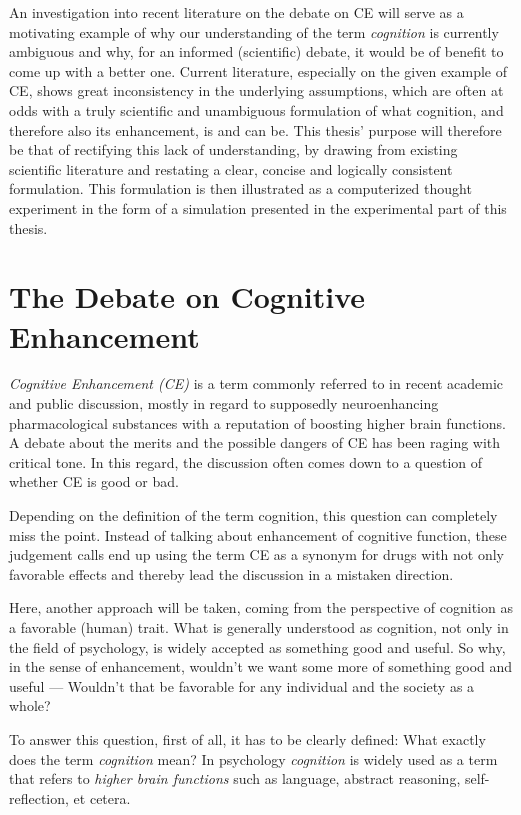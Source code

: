 An investigation into recent literature on the debate on CE will serve as a motivating example of why our understanding of the term \emph{cognition} is currently ambiguous and why, for an informed (scientific) debate, it would be of benefit to come up with a better one. Current literature, especially on the given example of CE, shows great inconsistency in the underlying assumptions, which are often at odds with a truly scientific and unambiguous formulation of what cognition, and therefore also its enhancement, is and can be. This thesis' purpose will therefore be that of rectifying this lack of understanding, by drawing from existing scientific literature and restating a clear, concise and logically consistent formulation. This formulation is then illustrated as a computerized thought experiment in the form of a simulation presented in the experimental part of this thesis.

\section{The Debate on Cognitive Enhancement}
\textit{Cognitive Enhancement (CE)} is a term commonly referred to in recent academic and public discussion, mostly in regard to supposedly neuroenhancing pharmacological substances with a reputation of boosting higher brain functions. A debate about the merits and the possible dangers of CE has been raging with critical tone. In this regard, the discussion often comes down to a question of whether CE is good or bad.

Depending on the definition of the term cognition, this question can completely miss the point. Instead of talking about enhancement of cognitive function, these judgement calls end up using the term CE as a synonym for drugs with not only favorable effects and thereby lead the discussion in a mistaken direction. 

Here, another approach will be taken, coming from the perspective of cognition as a favorable (human) trait. What is generally understood as cognition, not only in the field of psychology, is widely accepted as something good and useful. So why, in the sense of enhancement, wouldn't we want some more of something good and useful --- Wouldn't that be favorable for any individual and the society as a whole?

To answer this question, first of all, it has to be clearly defined: What exactly does the term \textit{cognition} mean? In psychology \textit{cognition} is widely used as a term that refers to \textit{higher brain functions} such as language, abstract reasoning, self-reflection, et cetera.


